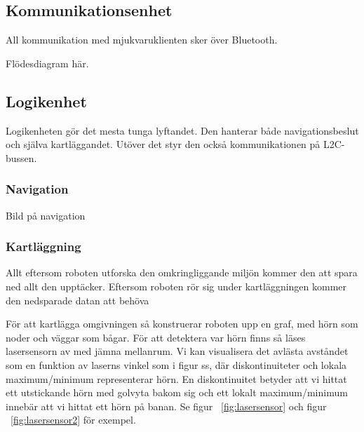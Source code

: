 \documentclass{article}
\begin{document}
\subsection{Kommunikationsenhet}
All kommunikation med mjukvaruklienten sker över Bluetooth.

Flödesdiagram här.

\subsection{Logikenhet}
Logikenheten gör det mesta tunga lyftandet. Den hanterar både navigationsbeslut och själva kartläggandet. Utöver det styr den också kommunikationen på L2C-bussen.

\subsubsection{Navigation}
Bild på navigation

\subsubsection{Kartläggning}

Allt eftersom roboten utforska den omkringliggande miljön kommer den att spara ned allt den upptäcker. Eftersom roboten rör sig under kartläggningen kommer den nedsparade datan att behöva

För att kartlägga omgivningen så konstruerar roboten upp en graf, med hörn som noder och väggar som bågar. För att detektera var hörn finns så läses lasersensorn av med jämna mellanrum. Vi kan visualisera det avlästa avståndet som en funktion av laserns vinkel som i figur ss, där diskontinuiteter och lokala maximum/minimum representerar hörn. En diskontinuitet betyder att vi hittat ett utstickande hörn med golvyta bakom sig och ett lokalt maximum/minimum innebär att vi hittat ett hörn på banan. Se figur ~\ref{fig:lasersensor} och figur ~\ref{fig:lasersensor2} för exempel.
\end{document}
